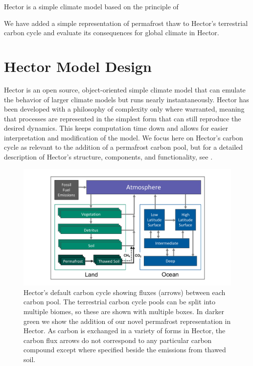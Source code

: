 \documentclass[essd, manuscript]{copernicus}
\begin{document}
Hector \citep{hartin_2015_simple, vega-westhoff_2019_impacts} is a simple climate model based on the principle of 

We have added a simple representation of permafrost thaw to Hector's terrestrial carbon cycle and evaluate its consequences for global climate in Hector. 

\section{Hector Model Design}
Hector \citep{hartin_2015_simple, hartin_2016_ocean} is an open source, object-oriented simple climate model that can emulate the behavior of larger climate models but runs nearly instantaneously. Hector has been developed with a philosophy of complexity only where warranted, meaning that processes are represented in the simplest form that can still reproduce the desired dynamics. This keeps computation time down and allows for easier interpretation and modification of the model. We focus here on Hector's carbon cycle as relevant to the addition of a permafrost carbon pool, but for a detailed description of Hector's structure, components, and functionality, see \citet{hartin_2015_simple}.  

\begin{figure}
    \centering
    \includegraphics[width=\textwidth]{figures/diagram_perm_ch4_split.pdf}
    \caption{Hector's default carbon cycle showing fluxes (arrows) between each carbon pool. The terrestrial carbon cycle pools can be split into multiple biomes, so these are shown with multiple boxes. In darker green we show the addition of our novel permafrost representation in Hector. As carbon is exchanged in a variety of forms in Hector, the carbon flux arrows do not correspond to any particular carbon compound except where specified beside the emissions from thawed soil.}
    \label{fig:diagram}
\end{figure}
\end{document}
